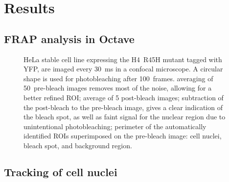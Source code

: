 \section{Results}

  \subsection{FRAP analysis in Octave}

      \begin{figure}
        \centering
        \hfill
        \hfill
          {
            HeLa stable cell line expressing the H4~R45H mutant tagged with YFP,
            are imaged every \SI{30}{\ms} in a confocal microscope. A circular
            shape is used for photobleaching after 100~frames.
             averaging of 50~pre-bleach
            images removes most of the noise, allowing for a better refined
            ROI;
             average of
            5 post-bleach images;
             subtraction of the
            post-bleach to the pre-bleach image, gives a clear indication
            of the bleach spot, as well as faint signal for the nuclear
            region due to unintentional photobleaching;
             perimeter of the
            automatically identified ROIs superimposed on the pre-bleach
            image: cell nuclei, bleach spot, and background region.
          }
        \label{fig:kill-frap:roi}
      \end{figure}

  \subsection{Tracking of cell nuclei}

